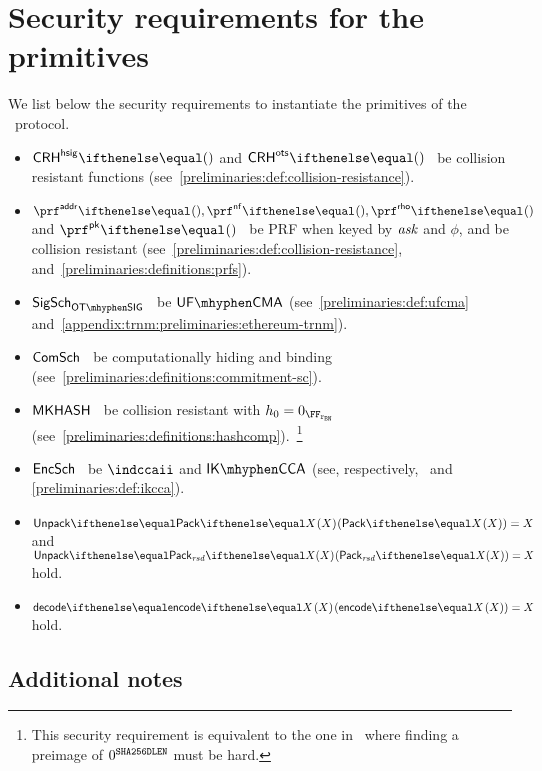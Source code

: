
\section{Security requirements for the primitives}\label{zeth-protocol:sec-req}

We list below the security requirements to instantiate the primitives of the \zeth~protocol.

\begin{itemize}
    \item $\crhhsig{}$ and $\crhots{}$ \MUST~be collision resistant functions (see~\cref{preliminaries:def:collision-resistance}).
    \item $\prfaddr{}{}, \prfnf{}{}, \prfrho{}{}$ and $\prfpk{}{}$ \MUST~be PRF when keyed by $\mathit{ask}$ and $\phi$, and be collision resistant (see~\cref{preliminaries:def:collision-resistance}, and~\cref{preliminaries:definitions:prfs}).
    \item $\otsigscheme$ \MUST~be $\ufcma$ (see~\cref{preliminaries:def:ufcma} and~\cref{appendix:trnm:preliminaries:ethereum-trnm}).
    \item $\mathsf{ComSch}$ \MUST~be computationally hiding and binding (see~\cref{preliminaries:definitions:commitment-sc}).
    \item $\mathsf{MKHASH}$ \MUST~be collision resistant with $h_0 = {0}_{\FFx{\rBN}}$ (see~\cref{preliminaries:definitions:hashcomp}).~\footnote{This security requirement is equivalent to the one in~\cite[Section 5.4.1.3]{zcashprotocol} where finding a preimage of $0^{\mathtt{SHA256DLEN}}$ must be hard.}
    \item $\mathsf{EncSch}$ \MUST~be $\indccaii$ and $\ikcca$ (see, respectively,~\cite[Definition 8]{abdalla1999dhaes} and \cref{preliminaries:def:ikcca}).
    \item $\unpack{\pack{X}{}}{} = X$ and $\unpack{\packResBits{X}}{} = X$ \MUST{} hold.
    \item $\decode{\encode{X}{}}{} = X$ \MUST{} hold.
\end{itemize}

\subsection{Additional notes}\label{zeth-protocol:sec-req:add-notes}


